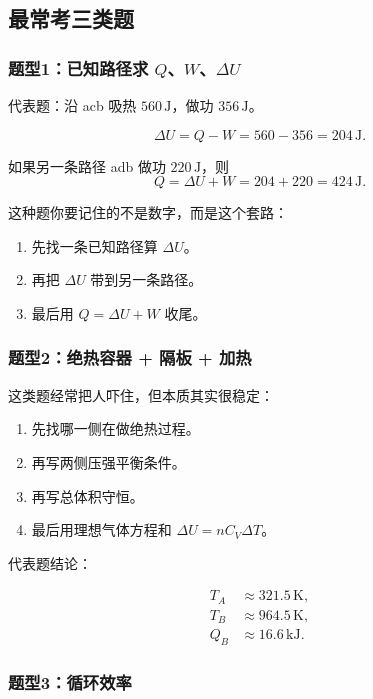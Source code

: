 \documentclass[12pt,a4paper]{article}
\begin{document}
\subsection{最常考三类题}

\subsubsection*{题型1：已知路径求 $Q$、$W$、$\Delta U$}

代表题：沿 acb 吸热 $560\,\mathrm{J}$，做功 $356\,\mathrm{J}$。

\[
\Delta U = Q-W = 560-356 = 204\,\mathrm{J}.
\]

如果另一条路径 adb 做功 $220\,\mathrm{J}$，则
\[
Q=\Delta U + W = 204+220 = 424\,\mathrm{J}.
\]

这种题你要记住的不是数字，而是这个套路：

\begin{enumerate}
  \item 先找一条已知路径算 $\Delta U$。
  \item 再把 $\Delta U$ 带到另一条路径。
  \item 最后用 $Q=\Delta U+W$ 收尾。
\end{enumerate}

\subsubsection*{题型2：绝热容器 + 隔板 + 加热}

这类题经常把人吓住，但本质其实很稳定：

\begin{enumerate}
  \item 先找哪一侧在做绝热过程。
  \item 再写两侧压强平衡条件。
  \item 再写总体积守恒。
  \item 最后用理想气体方程和 $\Delta U=nC_V\Delta T$。
\end{enumerate}

代表题结论：

\begin{align*}
T_A &\approx 321.5\,\mathrm{K},\\
T_B &\approx 964.5\,\mathrm{K},\\
Q_B &\approx 16.6\,\mathrm{kJ}.
\end{align*}

\subsubsection*{题型3：循环效率}
\end{document}
